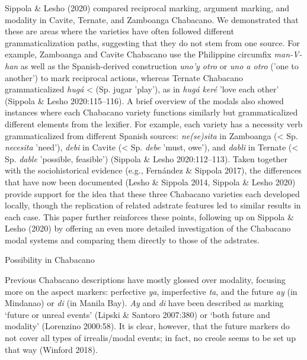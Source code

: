 \begin{styleStandard}
Sippola \& Lesho (2020) compared reciprocal marking, argument marking, and modality in Cavite, Ternate, and Zamboanga Chabacano. We demonstrated that these are areas where the varieties have often followed different grammaticalization paths, suggesting that they do not stem from one source. For example, Zamboanga and Cavite Chabacano use the Philippine circumfix \textit{man-V-han} as well as the Spanish-derived construction \textit{uno'y otro} or \textit{uno a otro} ('one to another') to mark reciprocal actions, whereas Ternate Chabacano grammaticalized \textit{hugá} {\textless} (Sp. jugar 'play'), as in \textit{hugá keré} 'love each other' (Sippola \& Lesho 2020:115–116). A brief overview of the modals also showed instances where each Chabacano variety functions similarly but grammaticalized different elements from the lexifier. For example, each variety has a necessity verb grammaticalized from different Spanish sources: \textit{ne(se)sita} in Zamboanga ({\textless} Sp. \textit{necesita} 'need'), \textit{debi} in Cavite ({\textless} Sp. \textit{debe} 'must, owe'), and \textit{dabli} in Ternate ({\textless} Sp. \textit{dable} 'possible, feasible') (Sippola \& Lesho 2020:112–113). Taken together with the sociohistorical evidence (e.g., Fernández \& Sippola 2017), the differences that have now been documented (Lesho \& Sippola 2014, Sippola \& Lesho 2020) provide support for the idea that these three Chabacano varieties each developed locally, though the replication of related adstrate features led to similar results in each case. This paper further reinforces these points, following up on Sippola \& Lesho (2020) by offering an even more detailed investigation of the Chabacano modal systems and comparing them directly to those of the adstrates.
\end{styleStandard}

\begin{listWWNumiiileveli}
\item 
\begin{listWWNumiiilevelii}
\item 
\begin{stylelsSectionii}
Possibility in Chabacano
\end{stylelsSectionii}
\end{listWWNumiiilevelii}
\end{listWWNumiiileveli}
\begin{styleStandard}
Previous Chabacano descriptions have mostly glossed over modality, focusing more on the aspect markers: perfective \textit{ya}, imperfective \textit{ta}, and the future \textit{ay} (in Mindanao) or \textit{di} (in Manila Bay). \textit{Ay} and \textit{di} have been described as marking ‘future or unreal events’ (Lipski \& Santoro 2007:380) or ‘both future and modality’ (Lorenzino 2000:58). It is clear, however, that the future markers do not cover all types of irrealis/modal events; in fact, no creole seems to be set up that way (Winford 2018). 
\end{styleStandard}

